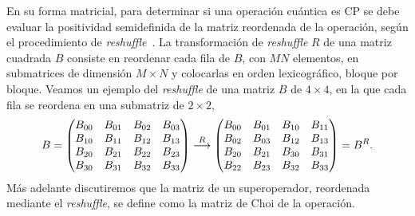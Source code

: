 En su forma matricial, para determinar si una operación cuántica es CP
se debe evaluar la positividad semidefinida de la matriz reordenada 
de la operación, según el procedimiento de
\textit{reshuffle}~\cite{bengtsson_zyczkowski_2017}.
La transformación de \textit{reshuffle} $R$ de una matriz cuadrada $B$ 
consiste en reordenar cada fila de $B$, con $MN$ elementos, 
en submatrices de dimensión $M\times N$ y colocarlas en 
orden lexicográfico, bloque por bloque. Veamos un ejemplo del 
\textit{reshuffle} de una matriz $B$ de $4\times 4$, en la que 
cada fila se reordena en una submatriz de $2\times 2$,
\begin{align}
B=
\mqty(
B_{00}&B_{01}&B_{02}&B_{03}\\
B_{10}&B_{11}&B_{12}&B_{13}\\
B_{20}&B_{21}&B_{22}&B_{23}\\
B_{30}&B_{31}&B_{32}&B_{33})
\stackrel{R}{\longrightarrow}
\mqty(
B_{00}&B_{01}&B_{10}&B_{11}\\
B_{02}&B_{03}&B_{12}&B_{13}\\
B_{20}&B_{21}&B_{30}&B_{31}\\
B_{22}&B_{23}&B_{32}&B_{33})
=B^R.
\label{eq:reshuffle}
\end{align}
Más adelante discutiremos que la matriz de un superoperador, 
reordenada mediante el \textit{reshuffle}, se define como la matriz de Choi
de la operación.

